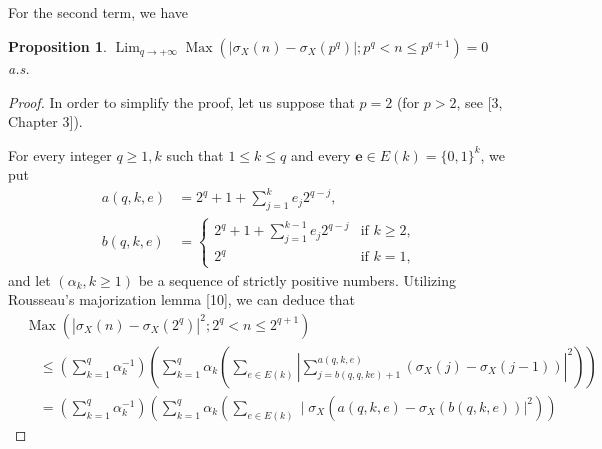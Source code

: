 \documentclass{article}
\newtheorem{proposition}{Proposition}
\theoremstyle{definition}
\begin{document}
\subsection{}

For the second term, we have
\begin{proposition}\label{prop:1}
$\operatorname{Lim}_{q \rightarrow+\infty} \operatorname{Max}\left(\left|\sigma_{X}(n)-\sigma_{X}\left(p^{q}\right)\right| ; p^{q}<n \leqslant p^{q+1}\right)=0$ a.s.
\end{proposition}

\begin{proof}
In order to simplify the proof, let us suppose that $p=2$ (for $p>2$, see [3, Chapter 3]).

For every integer $q \geqslant 1, k$ such that $1 \leqslant k \leqslant q$ and every $\boldsymbol{e} \in E(k)=\{0,1\}^{k}$, we put
\begin{equation}\label{eq:18}
\begin{aligned}
a(q, k, e)&=2^{q}+1+\sum_{j=1}^{k} e_{j} 2^{q-j}, \\
b(q, k, e)&= 
\begin{cases}
2^{q}+1+\sum_{j=1}^{k-1} e_{j} 2^{q-j} & \text{if } k \geqslant 2, \\
2^{q} & \text{if } k=1,
\end{cases}
\end{aligned}
\end{equation}
and let $(\alpha_{k}, k \geqslant 1)$ be a sequence of strictly positive numbers. Utilizing Rousseau's majorization lemma [10], we can deduce that
\begin{equation}\label{eq:19}
\begin{aligned}
&\operatorname{Max}\left(\left|\sigma_{X}(n)-\sigma_{X}\left(2^{q}\right)\right|^{2} ; 2^{q}<n \leqslant 2^{q+1}\right) \\
&\quad \leqslant\left(\sum_{k=1}^{q} \alpha_{k}^{-1}\right)\left(\sum_{k=1}^{q} \alpha_{k}\left(\sum_{e \in E(k)}\left|\sum_{j=b(q, q, k e)+1}^{a(q, k, e)}\left(\sigma_{X}(j)-\sigma_{X}(j-1)\right)\right|^{2}\right)\right) \\
&\quad=\left(\sum_{k=1}^{q} \alpha_{k}^{-1}\right)\left(\sum_{k=1}^{q} \alpha_{k}\left(\sum_{e \in E(k)} \mid \sigma_{X}\left(a(q, k, e)-\left.\sigma_{X}(b(q, k, e))\right|^{2}\right)\right) \right.
\end{aligned}
\end{equation}


\end{proof}
\end{document}

